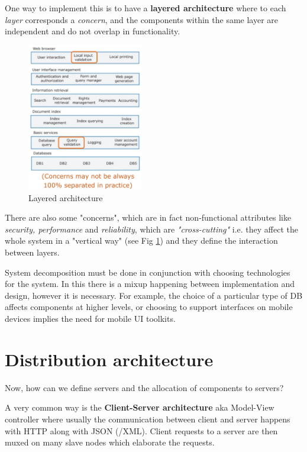 One way to implement this is to have a \textbf{layered architecture} where to each \textit{layer} corresponds a \textit{concern}, and the components within the same layer are independent and do not overlap in functionality.
\begin{figure}[h]
    \label{fig:layered_architecture}
    \centering
    \includegraphics[width=0.45\textwidth]{images/layered_architecture.png}
    \caption{Layered architecture}
\end{figure}
There are also some "concerns", which are in fact non-functional attributes like \textit{security, performance} and \textit{reliability}, which are \textit{"cross-cutting"} i.e. they affect the whole system in a "vertical way" (see Fig \ref{fig:layered_architecture}) and they define the interaction between layers.


System decomposition must be done in conjunction with choosing technologies for the system.
In this there is a mixup happening between implementation and design, however it is necessary.
For example, the choice of a particular type of DB affects components at higher levels, or choosing to support interfaces on mobile devices implies the need for mobile UI toolkits.

\section{Distribution architecture}
Now, how can we define servers and the allocation of components to servers?

A very common way is  the \textbf{Client-Server architecture}
aka Model-View controller where usually the communication between client and server happens with HTTP along with JSON (/XML).
Client requests to a server are then muxed on many slave nodes which elaborate the requests.

